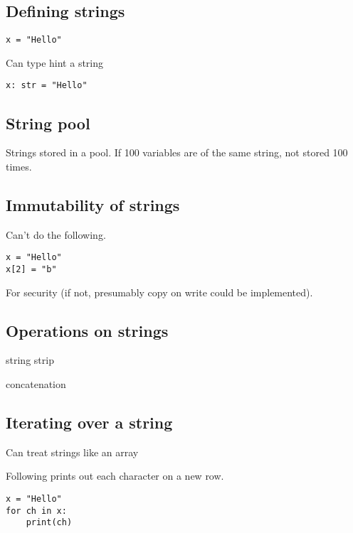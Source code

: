 
\subsection{Defining strings}

\begin{verbatim}
x = "Hello"
\end{verbatim}

Can type hint a string
\begin{verbatim}
x: str = "Hello"
\end{verbatim}


\subsection{String pool}

Strings stored in a pool. If 100 variables are of the same string, not stored 100 times.

\subsection{Immutability of strings}

Can't do the following.

\begin{verbatim}
x = "Hello"
x[2] = "b"
\end{verbatim}

For security (if not, presumably copy on write could be implemented).

\subsection{Operations on strings}
string strip

concatenation

\subsection{Iterating over a string}

Can treat strings like an array

Following prints out each character on a new row.

\begin{verbatim}
x = "Hello"
for ch in x:
    print(ch)
\end{verbatim}

